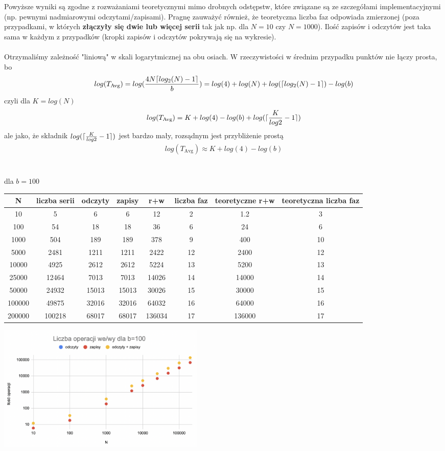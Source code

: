 \documentclass{article}
\DeclarePairedDelimiter\ceil{\lceil}{\rceil}
\begin{document}
Powyższe wyniki są zgodne z rozważaniami teoretycznymi mimo drobnych odstępstw, które
związane są ze szczegółami implementacyjnymi (np. pewnymi nadmiarowymi odczytami/zapisami).  Pragnę zauważyć również, że teoretyczna liczba faz odpowiada zmierzonej (poza przypadkami, w których \textbf{złączyły
się dwie lub więcej serii} tak jak np.  dla $N=10$ czy $N=1000$).   Ilość zapisów i odczytów jest taka sama w każdym z przypadków (kropki zapisów i odczytów pokrywają się na wykresie).
\\\\ Otrzymaliśmy zależność  "liniową" w skali 
logarytmicznej na obu osiach.  W rzeczywistości w średnim przypadku punktów nie łączy prosta,  bo 
\begin{gather*}
	log(T_{\text{Avg}}) = log(\frac{4N\ceil{log_2(N) - 1}}{b}) =  log(4) + log(N) + log(\ceil{log_2(N) - 1}) - log(b)
\end{gather*}
czyli dla $K = log(N)$
\begin{gather*}
	log(T_{\text{Avg}}) = K + log(4) - log(b) + log(\ceil{\frac{K}{log2} - 1})
\end{gather*} 
ale jako, że składnik $log(\ceil{\frac{K}{log2} - 1})$ jest bardzo mały, rozsądnym jest przybliżenie prostą
\begin{gather*}
	log(T_{\text{Avg}}) \approx K + log(4) - log(b)
\end{gather*}\\\\
dla $b=100$
\begin{center}
\begin{tabular}{ c c | c c c c | c c}
 N & liczba serii &odczyty & zapisy & r+w & liczba faz & teoretyczne r+w & teoretyczna liczba faz\\ 
\hline
 10 & 5 & 6 & 6 & 12 & 2 & 1.2 & 3\\  
 100 & 54 & 18 & 18 & 36 & 6 & 24 & 6 \\
 1000 & 504 & 189 & 189 & 378 & 9 & 400 & 10\\
 5000 & 2481 & 1211 & 1211 & 2422 & 12 & 2400 & 12\\
 10000 & 4925 & 2612 & 2612 & 5224 & 13 & 5200 & 13 \\
 25000 & 12464 &  7013 & 7013 & 14026 & 14 & 14000 & 14 \\
 50000 & 24932 & 15013 & 15013 & 30026 & 15 & 30000 & 15\\
 100000 & 49875 & 32016 & 32016 & 64032 & 16 & 64000 & 16\\
 200000 & 100218 & 68017 & 68017 & 136034 & 17 & 136000 & 17\\
\end{tabular}
\includegraphics[width=10cm]{b100}
\end{center}
\end{document}
